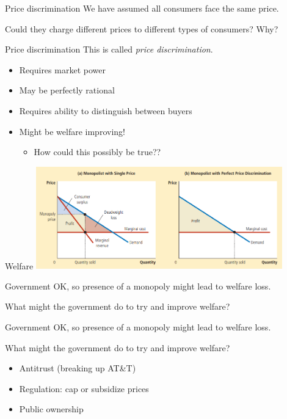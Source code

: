 \documentclass[aspectratio=169]{beamer}
\begin{document}
\begin{frame}{Price discrimination}
    We have assumed all consumers face the same price.

    \vspace{2mm}

    Could they charge different prices to different types of consumers? Why?
\end{frame}

\begin{frame}{Price discrimination}
    This is called \textit{price discrimination}.

    \begin{itemize}
        \item Requires market power
        \item May be perfectly rational
        \item Requires ability to distinguish between buyers
        \item Might be welfare improving!
        \begin{itemize}
            \item How could this possibly be true??
        \end{itemize}
    \end{itemize}
\end{frame}

\begin{frame}{Welfare}
    \centering
    \includegraphics[width = 0.8\textwidth,keepaspectratio]{pricediscrim.png}
\end{frame}

\begin{frame}{Government}
    OK, so presence of a monopoly might lead to welfare loss.

    \vspace{2mm}

    What might the government do to try and improve welfare?
\end{frame}

\begin{frame}{Government}
    OK, so presence of a monopoly might lead to welfare loss.

    \vspace{2mm}

    What might the government do to try and improve welfare?

    \vspace{5mm}

    \begin{itemize}
        \item Antitrust (breaking up AT\&T)
        \item Regulation: cap or subsidize prices
        \item Public ownership
    \end{itemize}
\end{frame}
\end{document}
